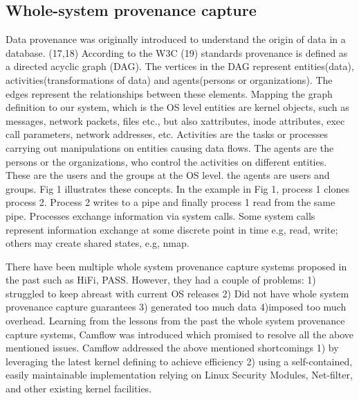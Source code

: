 \subsection{Whole-system provenance capture}
\label{A little about the graphs}
Data provenance was originally introduced to understand the origin of data in a database. (17,18) According to the W3C (19) standards provenance is defined as a directed acyclic graph (DAG). The vertices in the DAG represent entities(data), activities(transformations of data) and agents(persons or organizations). The edges represent the relationships between these elements. Mapping the graph definition to our system, which is the OS level entities are kernel objects, such as messages, network packets, files etc., but also xattributes, inode attributes, exec call parameters, network addresses, etc.
Activities are the tasks or processes carrying out manipulations on entities causing data flows. The agents are the persons or the organizations, who control the activities on different entities. These are the users and the groups at the OS level. 
 the agents are users and groups. Fig 1 illustrates these concepts. In the example in Fig 1, process 1 clones process 2. Process 2 writes to a pipe and finally process 1 read from the same pipe.
\vskip 0.2in 
Processes exchange information via system calls. Some system calls represent information exchange at some discrete point in time e.g, read, write; others may create shared states, e.g, nmap.


\label{A small recap into data provenance and whole system provenance capture}

There have been multiple whole system provenance capture systems proposed in the past such as HiFi, PASS. However, they had a couple of problems: 1) struggled to keep abreast with current OS releases 2) Did not have whole system provenance capture guarantees 3) generated too much data 4)imposed too much overhead. Learning from the lessons from the past the whole system provenance capture systems, Camflow was introduced which promised to resolve all the above mentioned issues. Camflow addressed the above mentioned shortcomings 1) by leveraging the latest kernel defining to achieve efficiency 2) using a self-contained, easily maintainable implementation relying on Linux Security Modules, Net-filter, and other existing kernel facilities.


